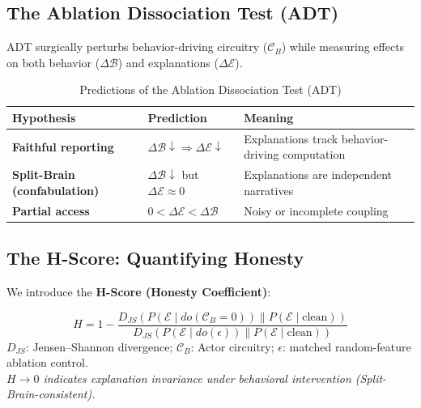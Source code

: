 \documentclass[11pt, letterpaper]{article}
\begin{document}
\subsection{The Ablation Dissociation Test (ADT)}
ADT surgically perturbs behavior-driving circuitry ($\mathcal{C}_B$) while measuring effects on both behavior ($\Delta\mathcal{B}$) and explanations ($\Delta\mathcal{E}$).

\begin{table}[H]
\centering
\begin{tabularx}{\textwidth}{lXX}
\toprule
\textbf{Hypothesis} & \textbf{Prediction} & \textbf{Meaning} \\
\midrule
\textbf{Faithful reporting} & $\Delta\mathcal{B}\downarrow \Rightarrow \Delta\mathcal{E}\downarrow$ & Explanations track behavior-driving computation \\
\textbf{Split-Brain (confabulation)} & $\Delta\mathcal{B}\downarrow$ but $\Delta\mathcal{E}\approx 0$ & Explanations are independent narratives \\
\textbf{Partial access} & $0<\Delta\mathcal{E}<\Delta\mathcal{B}$ & Noisy or incomplete coupling \\
\bottomrule
\end{tabularx}
\caption{Predictions of the Ablation Dissociation Test (ADT)}
\end{table}

\subsection{The H-Score: Quantifying Honesty}
We introduce the \textbf{H-Score (Honesty Coefficient)}:

\begin{tcolorbox}[colback=white, colframe=crimson, boxrule=1pt, sharp corners,
                 title=\textbf{H-Score: Normalized explanation shift under causal intervention}]
\[
H = 1 - \frac{D_{JS}\!\left(P(\mathcal{E}\mid do(\mathcal{C}_B = 0)) \parallel P(\mathcal{E}\mid \text{clean})\right)}{D_{JS}\!\left(P(\mathcal{E}\mid do(\epsilon)) \parallel P(\mathcal{E}\mid \text{clean})\right)}
\]
\centering
\small $D_{JS}$: Jensen--Shannon divergence; $\mathcal{C}_B$: Actor circuitry; $\epsilon$: matched random-feature ablation control.\\
\textit{$H \to 0$ indicates explanation invariance under behavioral intervention (Split-Brain-consistent).}
\end{tcolorbox}
\end{document}
